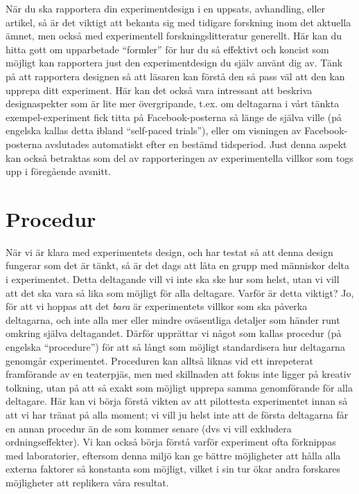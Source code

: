\documentclass[
]{book}
\begin{document}
När du ska rapportera din experimentdesign i en uppsats, avhandling, eller artikel, så är det viktigt att bekanta sig med tidigare forskning inom det aktuella ämnet, men också med experimentell forskningslitteratur generellt. Här kan du hitta gott om upparbetade ``formler'' för hur du så effektivt och koncist som möjligt kan rapportera just den experimentdesign du själv använt dig av. Tänk på att rapportera designen så att läsaren kan förstå den så pass väl att den kan upprepa ditt experiment. Här kan det också vara intressant att beskriva designaspekter som är lite mer övergripande, t.ex. om deltagarna i vårt tänkta exempel-experiment fick titta på Facebook-posterna så länge de själva ville (på engelska kallas detta ibland ``self-paced trials''), eller om visningen av Facebook-posterna avslutades automatiskt efter en bestämd tidsperiod. Just denna aspekt kan också betraktas som del av rapporteringen av experimentella villkor som togs upp i föregående avsnitt.

\hypertarget{sec07.6}{%
\section{Procedur}\label{sec07.6}}

När vi är klara med experimentets design, och har testat så att denna design fungerar som det är tänkt, så är det dags att låta en grupp med människor delta i experimentet. Detta deltagande vill vi inte ska ske hur som helst, utan vi vill att det ska vara så lika som möjligt för alla deltagare. Varför är detta viktigt? Jo, för att vi hoppas att det \emph{bara} är experimentets villkor som ska påverka deltagarna, och inte alla mer eller mindre oväsentliga detaljer som händer runt omkring själva deltagandet. Därför upprättar vi något som kallas procedur (på engelska ``procedure'') för att så långt som möjligt standardisera hur deltagarna genomgår experimentet. Proceduren kan alltså liknas vid ett inrepeterat framförande av en teaterpjäs, men med skillnaden att fokus inte ligger på kreativ tolkning, utan på att så exakt som möjligt upprepa samma genomförande för alla deltagare. Här kan vi börja förstå vikten av att pilottesta experimentet innan så att vi har tränat på alla moment; vi vill ju helst inte att de första deltagarna får en annan procedur än de som kommer senare (dvs vi vill exkludera ordningseffekter). Vi kan också börja förstå varför experiment ofta förknippas med laboratorier, eftersom denna miljö kan ge bättre möjligheter att hålla alla externa faktorer så konstanta som möjligt, vilket i sin tur ökar andra forskares möjligheter att replikera våra resultat.
\end{document}
